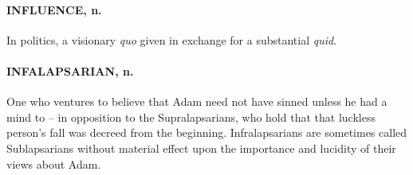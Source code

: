 \documentclass[11pt]{article}
\begin{document}
\paragraph{INFLUENCE, n.}  In politics, a visionary {\em quo} given in exchange for a
substantial {\em quid}.

\paragraph{INFALAPSARIAN, n.}  One who ventures to believe that Adam need not have
sinned unless he had a mind to -- in opposition to the
Supralapsarians, who hold that that luckless person's fall was decreed
from the beginning.  Infralapsarians are sometimes called
Sublapsarians without material effect upon the importance and lucidity
of their views about Adam.
\end{document}
